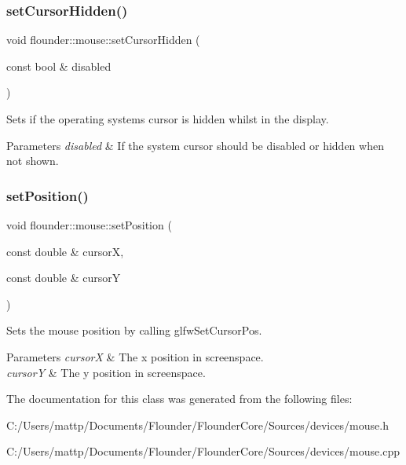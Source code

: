\subsubsection{\texorpdfstring{set\+Cursor\+Hidden()}{setCursorHidden()}}
{\footnotesize\ttfamily void flounder\+::mouse\+::set\+Cursor\+Hidden (\begin{DoxyParamCaption}\item[{const bool \&}]{disabled }\end{DoxyParamCaption})}



Sets if the operating systems cursor is hidden whilst in the display. 


\begin{DoxyParams}{Parameters}
{\em disabled} & If the system cursor should be disabled or hidden when not shown. \\
\hline
\end{DoxyParams}
\mbox{\label{classflounder_1_1mouse_a47fae906e36e62f4cfd5939b37a0476c}} 
\subsubsection{\texorpdfstring{set\+Position()}{setPosition()}}
{\footnotesize\ttfamily void flounder\+::mouse\+::set\+Position (\begin{DoxyParamCaption}\item[{const double \&}]{cursorX,  }\item[{const double \&}]{cursorY }\end{DoxyParamCaption})}



Sets the mouse position by calling glfw\+Set\+Cursor\+Pos. 


\begin{DoxyParams}{Parameters}
{\em cursorX} & The x position in screenspace. \\
\hline
{\em cursorY} & The y position in screenspace. \\
\hline
\end{DoxyParams}


The documentation for this class was generated from the following files\+:\begin{DoxyCompactItemize}
\item 
C\+:/\+Users/mattp/\+Documents/\+Flounder/\+Flounder\+Core/\+Sources/devices/mouse.\+h\item 
C\+:/\+Users/mattp/\+Documents/\+Flounder/\+Flounder\+Core/\+Sources/devices/mouse.\+cpp\end{DoxyCompactItemize}
